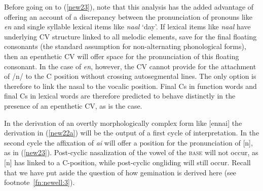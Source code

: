 \documentclass[output=paper]{langscibook}
\begin{document}
Before going on to (\ref{new23}), note that this analysis has the added advantage of offering an account of a discrepancy between the pronunciation of pronouns like \textit{en} and single syllable lexical items like \textit{naal} ‘day’. If lexical items like \textit{naal} have underlying CV structure linked to all melodic elements, save for the final floating consonants (the standard assumption for non-alternating phonological forms), then an epenthetic CV will offer space for the pronunciation of this floating consonant. In the case of \textit{en}, however, the CV cannot provide for the attachment of /n/ to the C position without crossing autosegmental lines. The only option is therefore to link the nasal to the vocalic position. Final Cs in function words and final Cs in lexical words are therefore predicted to behave distinctly in the presence of an epenthetic CV, as is the case.

In the derivation of an overtly morphologically complex form like [ennai] the derivation in (\ref{new22a}) will be the output of a first cycle of interpretation. In the second cycle the affixation of \textit{ai} will offer a position for the pronunciation of [n], as in (\ref{new23}). Post-cyclic nasalization of the vowel of the \textsc{base} will not occur, as [n] has linked to a C-position, while post-cyclic ongliding will still occur. Recall that we have put aside the question of how gemination is derived here (see footnote~\ref{fn:newell:3}).
\end{document}
